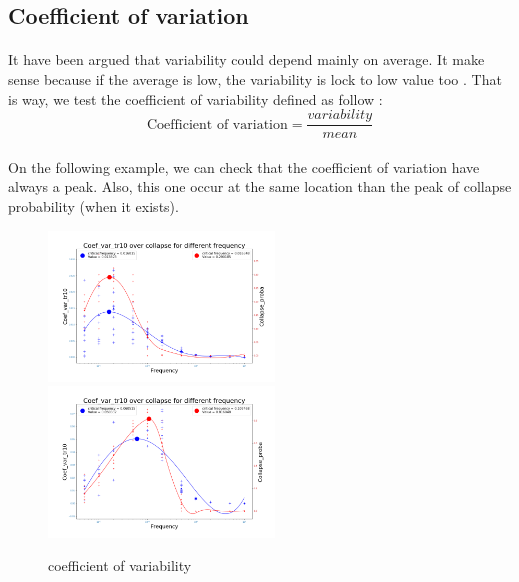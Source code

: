 \documentclass{article}
\begin{document}
\subsection{Coefficient of variation}


\paragraph{}
It have been argued that variability could depend mainly on average. It make sense because if the average is low, the variability is lock to low value too \citep{contamin_indicators_2009, fung_warning_2013, wang_early_2018, baggio_optimal_2016, beninca_resonance_2011}. That is way, we test the coefficient of variability defined as follow :
\[
\text{Coefficient\ of\ variation} = \frac{variability}{mean}
\]
    
\paragraph{}
On the following example, we can check that the coefficient of variation have always a peak. Also, this one occur at the same location than the peak of collapse probability (when it exists).
    
\begin{figure}[h!]
\centering
\includegraphics[width=6cm]{coef1c.png} 
\includegraphics[width=6cm]{coef3c.png} 
\caption{coefficient of variability}
\end{figure}
\end{document}
